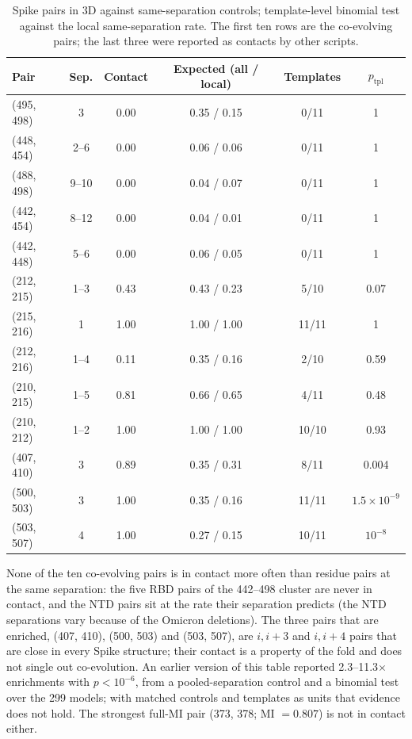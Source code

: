 \begin{table}[ht]
	\centering
	\caption{Spike pairs in 3D against same-separation controls; template-level
		binomial test against the local same-separation rate.  The first ten rows
		are the co-evolving pairs; the last three were reported as contacts by
		other scripts.}
	\label{tab:spike-3d}
	\begin{tabular}{lccccc}
		\toprule
		Pair       & Sep.    & Contact & Expected (all / local) & Templates & $p_{\text{tpl}}$  \\
		\midrule
		(495, 498) & 3       & 0.00    & 0.35 / 0.15            & 0/11      & 1                 \\
		(448, 454) & 2--6    & 0.00    & 0.06 / 0.06            & 0/11      & 1                 \\
		(488, 498) & 9--10   & 0.00    & 0.04 / 0.07            & 0/11      & 1                 \\
		(442, 454) & 8--12   & 0.00    & 0.04 / 0.01            & 0/11      & 1                 \\
		(442, 448) & 5--6    & 0.00    & 0.06 / 0.05            & 0/11      & 1                 \\
		(212, 215) & 1--3    & 0.43    & 0.43 / 0.23            & 5/10      & 0.07              \\
		(215, 216) & 1       & 1.00    & 1.00 / 1.00            & 11/11     & 1                 \\
		(212, 216) & 1--4    & 0.11    & 0.35 / 0.16            & 2/10      & 0.59              \\
		(210, 215) & 1--5    & 0.81    & 0.66 / 0.65            & 4/11      & 0.48              \\
		(210, 212) & 1--2    & 1.00    & 1.00 / 1.00            & 10/10     & 0.93              \\
		\midrule
		(407, 410) & 3       & 0.89    & 0.35 / 0.31            & 8/11      & 0.004             \\
		(500, 503) & 3       & 1.00    & 0.35 / 0.16            & 11/11     & $1.5\times10^{-9}$ \\
		(503, 507) & 4       & 1.00    & 0.27 / 0.15            & 10/11     & $10^{-8}$         \\
		\bottomrule
	\end{tabular}
\end{table}

None of the ten co-evolving pairs is in contact more often than residue pairs
at the same separation: the five RBD pairs of the 442--498 cluster are never
in contact, and the NTD pairs sit at the rate their separation predicts (the
NTD separations vary because of the Omicron deletions).  The three pairs that
are enriched, (407, 410), (500, 503) and (503, 507), are $i,i{+}3$ and
$i,i{+}4$ pairs that are close in every Spike structure; their contact is a
property of the fold and does not single out co-evolution.  An earlier
version of this table reported 2.3--11.3$\times$ enrichments with
$p < 10^{-6}$, from a pooled-separation control and a binomial test over the
299 models; with matched controls and templates as units that evidence does
not hold.  The strongest full-MI pair (373, 378; MI $= 0.807$) is not in
contact either.

